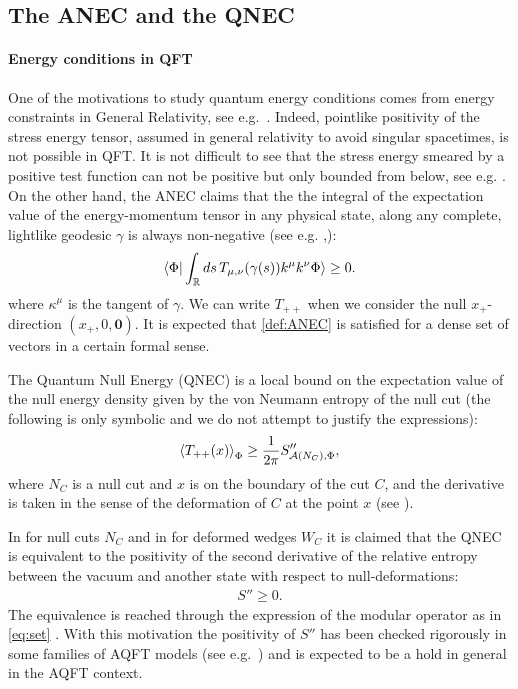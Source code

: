 \documentclass[12pt]{article}
\def\RR{{\mathbb R}}
\def\A{{\mathcal A}}
\def\k{\kappa}
\theoremstyle{remark}
\begin{document}
\subsection{The ANEC and the QNEC}\label{sec:QNEC-ANEC}



\paragraph{Energy conditions in QFT}
One of the motivations to study quantum energy conditions comes from energy constraints in General Relativity, see e.g.~\cite{Few12}. Indeed, pointlike positivity of the stress energy tensor, assumed in general relativity to avoid singular spacetimes, is not possible in QFT.
It is not difficult to see that the stress energy smeared by a positive test function can not be positive but only bounded from below, see e.g.\! \cite{FH05}.
On the other hand, the ANEC claims that the the integral of the expectation value of the energy-momentum tensor in any physical state, along any complete, lightlike geodesic $\gamma$ is always non-negative (see e.g.\! \cite[(3)]{FLPW16},\cite{Verch00}):
\begin{align}\label{def:ANEC}
	\braket{\Phi|\int_\RR ds \,T_{\mu,\nu}(\gamma(s))k^\mu k^\nu \Phi }\geq 0.
\end{align}where  $\k^\mu$ is  the tangent of $\gamma.$ We can write $T_{++}$ when we consider the null $x_+$-direction $(x_+,0,\pmb{0})$.
It is expected that  \eqref{def:ANEC} is satisfied for a dense set of vectors in a certain formal sense.

The Quantum Null Energy (QNEC) is a local bound on the expectation value of the null energy density given by the von Neumann entropy of
the null cut (the following is only symbolic and we do not attempt to justify the expressions):
	\begin{align*}
		\braket{T_{++}(x)}_\Phi\geq \frac{1}{2\pi}S''_{\A(N_C),\Phi},
	\end{align*}
where $N_C$ is a null cut and $x$ is on the boundary of the cut $C$, and the derivative is taken
in the sense of the deformation of $C$ at the point $x$ (see \cite{BFKW19}).


In \cite{BFLW16} for null cuts $N_C$ and in \cite{LLS18} for deformed wedges $W_C$ it is claimed
that the QNEC is equivalent to the positivity of the second derivative of the relative entropy between the vacuum and
another state with respect to null-deformations:
\begin{align}\label{def:QNEC2}
	S''\geq 0.
\end{align}
The equivalence is reached through the expression of the modular operator as in  \eqref{eq:set} .
 With this motivation the positivity of $S''$ has been checked rigorously in some families of AQFT models (see e.g.~\cite{LongoLocalised,CLR20,Longocoherent, Pan19})
 and is expected to be a hold in general in the AQFT context.
\end{document}

